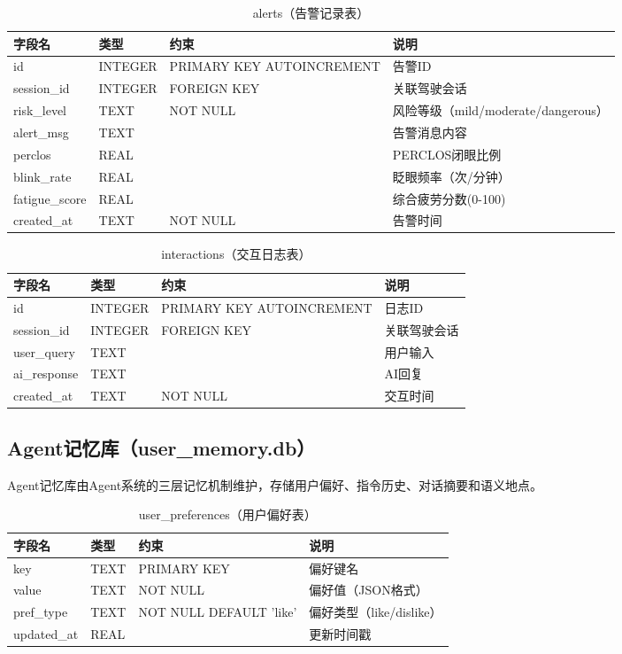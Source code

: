 \documentclass[a4paper]{article}
\begin{document}
\begin{table}[H]
  \centering
  \caption{alerts（告警记录表）}
  \label{tab:alerts}
  \begin{tabular}{llll}
  \toprule
  字段名 & 类型 & 约束 & 说明 \\
  \midrule
  id & INTEGER & PRIMARY KEY AUTOINCREMENT & 告警ID \\
  session\_id & INTEGER & FOREIGN KEY & 关联驾驶会话 \\
  risk\_level & TEXT & NOT NULL & 风险等级（mild/moderate/dangerous）\\
  alert\_msg & TEXT &  & 告警消息内容 \\
  perclos & REAL &  & PERCLOS闭眼比例 \\
  blink\_rate & REAL &  & 眨眼频率（次/分钟）\\
  fatigue\_score & REAL &  & 综合疲劳分数(0-100) \\
  created\_at & TEXT & NOT NULL & 告警时间 \\
  \bottomrule
  \end{tabular}
\end{table}

\begin{table}[H]
  \centering
  \caption{interactions（交互日志表）}
  \label{tab:interactions}
  \begin{tabular}{llll}
  \toprule
  字段名 & 类型 & 约束 & 说明 \\
  \midrule
  id & INTEGER & PRIMARY KEY AUTOINCREMENT & 日志ID \\
  session\_id & INTEGER & FOREIGN KEY & 关联驾驶会话 \\
  user\_query & TEXT &  & 用户输入 \\
  ai\_response & TEXT &  & AI回复 \\
  created\_at & TEXT & NOT NULL & 交互时间 \\
  \bottomrule
  \end{tabular}
\end{table}

\subsection{Agent记忆库（user\_memory.db）}

Agent记忆库由Agent系统的三层记忆机制维护，存储用户偏好、指令历史、对话摘要和语义地点。

\begin{table}[H]
  \centering
  \caption{user\_preferences（用户偏好表）}
  \label{tab:user_preferences}
  \begin{tabular}{llll}
  \toprule
  字段名 & 类型 & 约束 & 说明 \\
  \midrule
  key & TEXT & PRIMARY KEY & 偏好键名 \\
  value & TEXT & NOT NULL & 偏好值（JSON格式）\\
  pref\_type & TEXT & NOT NULL DEFAULT 'like' & 偏好类型（like/dislike）\\
  updated\_at & REAL &  & 更新时间戳 \\
  \bottomrule
  \end{tabular}
\end{table}
\end{document}
